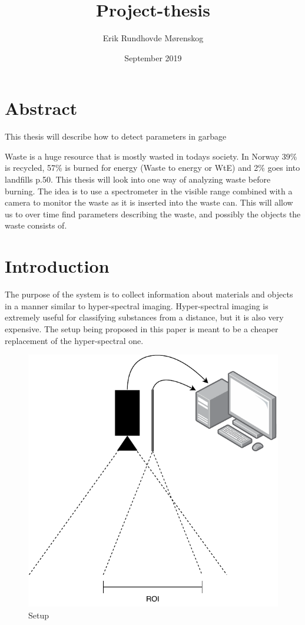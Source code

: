 \documentclass{article}
\title{Project-thesis}
\author{Erik Rundhovde M\o renskog}
\date{September 2019}
\begin{document}
\maketitle

\section{Abstract}
This thesis will describe how to detect parameters in garbage 

Waste is a huge resource that is mostly wasted in todays society. In Norway 39\% is recycled, 57\% is burned for energy (Waste to energy or WtE) and 2\% goes into landfills \cite{EnvironmentGlance20152015} p.50. This thesis will look into one way of analyzing waste before burning. The idea is to use a spectrometer in the visible range combined with a camera to monitor the waste as it is inserted into the waste can. This will allow us to over time find parameters describing the waste, and possibly the objects the waste consists of. 


\section{Introduction}
The purpose of the system is to collect information about materials and objects in a manner similar to hyper-spectral imaging. Hyper-spectral imaging is extremely useful for classifying substances from a distance, but it is also very expensive. The setup being proposed in this paper is meant to be a cheaper replacement of the hyper-spectral one. 


\begin{figure}[]
    \centering
    \includegraphics[]{figures/pt_setup.pdf}
    \caption{Setup}
    \label{}
\end{figure}
\end{document}
